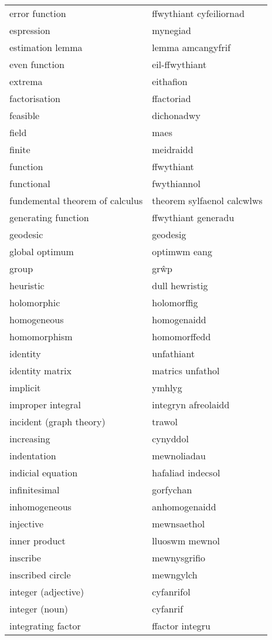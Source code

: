 \begin{supertabular}{p{0.22\textwidth}p{0.22\textwidth}}
error function & ffwythiant cyfeiliornad \\
espression & mynegiad \\
estimation lemma & lemma amcangyfrif \\
even function & eil-ffwythiant \\
extrema & eithafion \\
factorisation & ffactoriad \\
feasible & dichonadwy \\
field & maes \\
finite & meidraidd \\
function & ffwythiant \\
functional & fwythiannol \\
fundemental theorem of calculus & theorem sylfaenol calcwlws \\
generating function & ffwythiant generadu \\
geodesic & geodesig \\
global optimum & optimwm eang \\
group & grŵp \\
heuristic & dull hewristig \\
holomorphic & holomorffig \\
homogeneous & homogenaidd \\
homomorphism & homomorffedd \\
identity & unfathiant \\
identity matrix & matrics unfathol \\
implicit & ymhlyg \\
improper integral & integryn afreolaidd \\
incident (graph theory) & trawol \\
increasing & cynyddol \\
indentation & mewnoliadau \\
indicial equation & hafaliad indecsol \\
infinitesimal & gorfychan \\
inhomogeneous & anhomogenaidd \\
injective & mewnsaethol \\
inner product & lluoswm mewnol \\
inscribe & mewnysgrifio \\
inscribed circle & mewngylch \\
integer (adjective) & cyfanrifol \\
integer (noun) & cyfanrif \\
integrating factor & ffactor integru \\

\end{supertabular}
